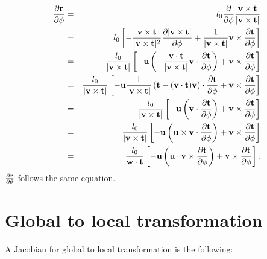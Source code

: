 \documentclass[12pt,a4paper]{scrarticle}
\begin{document}
\begin{eqnarray}\label{eq:drdphi}
    \frac{\partial{\mathbf{r}}}{\partial \phi} & = &  l_0 \frac{\partial}{\partial \phi} \frac{\mathbf{v} \times \mathbf{t}}{|\mathbf{v} \times \mathbf{t}|} \nonumber \\
    & = & l_0 \left[ - \frac{\mathbf{v} \times \mathbf{t}}{|\mathbf{v} \times \mathbf{t}|^2} \frac{\partial |\mathbf{v} \times \mathbf{t}|}{\partial \phi} + \frac{1}{|\mathbf{v} \times \mathbf{t}|} \mathbf{v} \times \frac{\partial \mathbf{t}}{\partial \phi} \right] \nonumber \\
    & = & \frac{l_0}{|\mathbf{v} \times \mathbf{t}|}\left[ -\mathbf{u} \left( -\frac{\mathbf{v} \cdot \mathbf{t}}{|\mathbf{v} \times \mathbf{t}|} \mathbf{v} \cdot \frac{\partial \mathbf{t}}{\partial \phi} \right)  + \mathbf{v} \times \frac{\partial \mathbf{t}}{\partial \phi}  \right] \nonumber \\
    & = & \frac{l_0}{|\mathbf{v} \times \mathbf{t}|}\left[ -\mathbf{u} \frac{1}{|\mathbf{v} \times \mathbf{t}|} \left( \mathbf{t} - (\mathbf{v} \cdot \mathbf{t})\mathbf{v} \right) \cdot \frac{\partial \mathbf{t}}{\partial \phi} + \mathbf{v} \times \frac{\partial \mathbf{t}}{\partial \phi}  \right] \nonumber \\
    & = & \frac{l_0}{|\mathbf{v} \times \mathbf{t}|}\left[ -\mathbf{u} \left( \mathbf{v} \cdot \frac{\partial \mathbf{t}}{\partial \phi} \right)  + \mathbf{v} \times \frac{\partial \mathbf{t}}{\partial \phi}  \right] \nonumber \\
    & = & \frac{l_0}{|\mathbf{v} \times \mathbf{t}|}\left[ -\mathbf{u} \left( \mathbf{u} \times \mathbf{v} \cdot \frac{\partial \mathbf{t}}{\partial \phi} \right)  + \mathbf{v} \times \frac{\partial \mathbf{t}}{\partial \phi}  \right] \nonumber \\   
    & = & \frac{l_0}{\mathbf{w} \cdot \mathbf{t}}\left[ -\mathbf{u} \left( \mathbf{u} \cdot \mathbf{v} \times \frac{\partial \mathbf{t}}{\partial \phi} \right)  + \mathbf{v} \times \frac{\partial \mathbf{t}}{\partial \phi}  \right].    
\end{eqnarray}
$\frac{\partial \mathbf{r}}{\partial \theta}$ follows the same equation.

\section{Global to local transformation}

A Jacobian for global to local transformation is the following:
\end{document}
